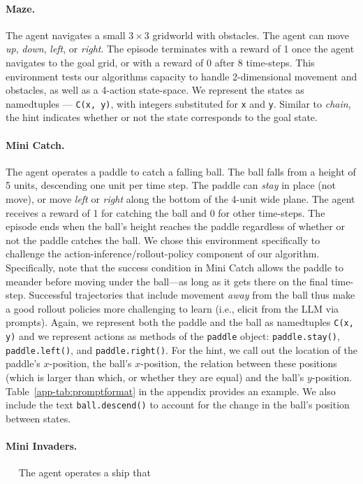 \documentclass{article}
\begin{document}
\paragraph{Maze.} The agent navigates a small $3\times 3$ gridworld with
obstacles. The agent can move \emph{up}, \emph{down}, \emph{left}, or
\emph{right}. The episode terminates with a reward of 1 once the agent navigates
to the goal grid, or with a reward of 0 after 8 time-steps. This environment
tests our algorithms capacity to handle 2-dimensional movement and obstacles, as
well as a 4-action state-space. We represent the states as namedtuples ---
\texttt{C(x, y)}, with integers substituted for \texttt{x} and \texttt{y}.
Similar to \emph{chain}, the hint indicates whether or not the state corresponds
to the goal state.
\paragraph{Mini Catch.}
The agent operates a paddle to catch a falling ball. The ball falls from a
height of 5 units, descending one unit per time step. The paddle can \emph{stay}
in place (not move), or move \emph{left} or \emph{right} along the bottom of the
4-unit wide plane. The agent receives a reward of 1 for catching the ball and 0
for other time-steps. The episode ends when the ball's height reaches the paddle
regardless of whether or not the paddle catches the ball.
We chose this environment specifically to challenge the
action-inference/rollout-policy component of our algorithm. Specifically, note
that the success condition in Mini Catch allows the paddle to meander before
moving under the ball---as long as it gets there on the final time-step.
Successful trajectories that include movement \textit{away} from the ball thus
make a good rollout policies more challenging to learn (i.e., elicit from the
LLM via prompts).
Again, we represent both the paddle and the ball as namedtuples \texttt{C(x,
  y)} and we represent actions as methods of the \texttt{paddle} object:
\texttt{paddle.stay()}, \texttt{paddle.left()}, and \texttt{paddle.right()}.
For the hint, we call out the location of the paddle's $x$-position, the
ball's $x$-position, the relation between these positions (which is larger
than which, or whether they are equal) and the ball's $y$-position.
Table~\ref{app-tab:promptformat} in the appendix provides an example. We also include the text
\texttt{ball.descend()} to account for the change in the ball's position
between states. \paragraph{Mini Invaders.}~~ The agent operates a ship that
\end{document}
